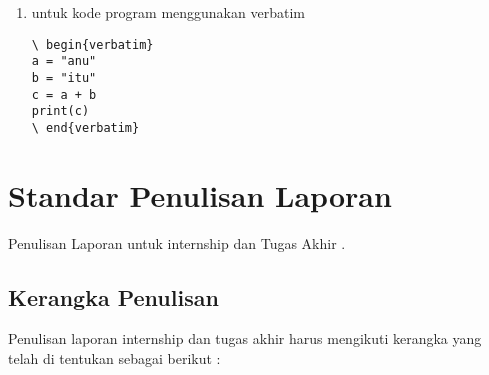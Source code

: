 \begin{enumerate}
    \item untuk kode program menggunakan verbatim
    \begin{verbatim}
\ begin{verbatim}
a = "anu"
b = "itu"
c = a + b
print(c) 
\ end{verbatim}
    \end{verbatim}
\end{enumerate}





\chapter{Standar Penulisan Laporan}

Penulisan Laporan untuk internship dan Tugas Akhir . 

\section{Kerangka Penulisan}
Penulisan laporan internship dan tugas akhir harus mengikuti kerangka yang telah di tentukan sebagai berikut :


